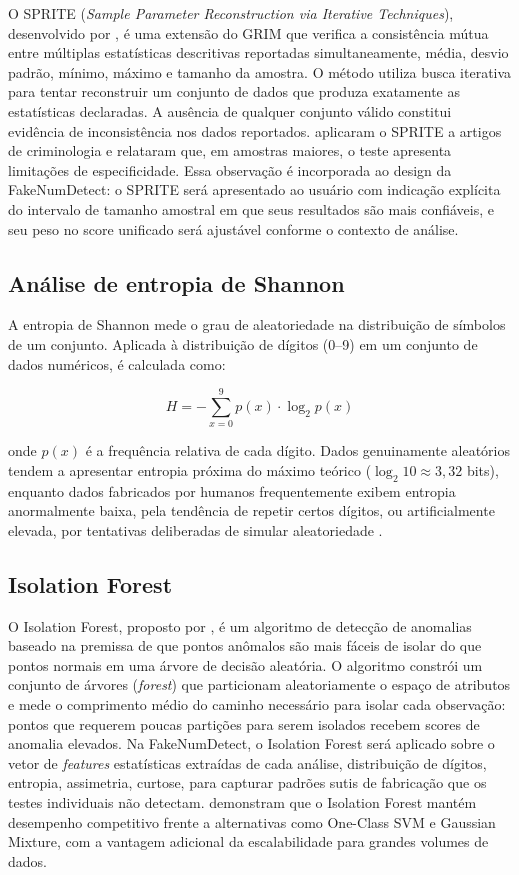 \documentclass[
    12pt,                %
    openright,           %
    oneside,             %
    a4paper,             %
    english,             %
    brazil               %
]{abntex2}
\begin{document}
O SPRITE (\textit{Sample Parameter Reconstruction via Iterative Techniques}), desenvolvido por , é uma extensão do GRIM que verifica a consistência mútua entre múltiplas estatísticas descritivas reportadas simultaneamente, média, desvio padrão, mínimo, máximo e tamanho da amostra. O método utiliza busca iterativa para tentar reconstruir um conjunto de dados que produza exatamente as estatísticas declaradas. A ausência de qualquer conjunto válido constitui evidência de inconsistência nos dados reportados.
 aplicaram o SPRITE a artigos de criminologia e relataram que, em amostras maiores, o teste apresenta limitações de especificidade. Essa observação é incorporada ao design da FakeNumDetect: o SPRITE será apresentado ao usuário com indicação explícita do intervalo de tamanho amostral em que seus resultados são mais confiáveis, e seu peso no score unificado será ajustável conforme o contexto de análise.

\subsection{Análise de entropia de Shannon}
A entropia de Shannon \cite{Shannon1948} mede o grau de aleatoriedade na distribuição de símbolos de um conjunto. Aplicada à distribuição de dígitos (0--9) em um conjunto de dados numéricos, é calculada como:

\begin{equation}
    H = -\sum_{x=0}^{9} p(x) \cdot \log_2 p(x)
\end{equation}

onde \(p(x)\) é a frequência relativa de cada dígito. Dados genuinamente aleatórios tendem a apresentar entropia próxima do máximo teórico (\(\log_2 10 \approx 3{,}32\) bits), enquanto dados fabricados por humanos frequentemente exibem entropia anormalmente baixa, pela tendência de repetir certos dígitos, ou artificialmente elevada, por tentativas deliberadas de simular aleatoriedade \cite{Mosimann1995}.

\subsection{Isolation Forest}

O Isolation Forest, proposto por , é um algoritmo de detecção de anomalias baseado na premissa de que pontos anômalos são mais fáceis de isolar do que pontos normais em uma árvore de decisão aleatória. O algoritmo constrói um conjunto de árvores (\textit{forest}) que particionam aleatoriamente o espaço de atributos e mede o comprimento médio do caminho necessário para isolar cada observação: pontos que requerem poucas partições para serem isolados recebem scores de anomalia elevados.
Na FakeNumDetect, o Isolation Forest será aplicado sobre o vetor de \textit{features} estatísticas extraídas de cada análise, distribuição de dígitos, entropia, assimetria, curtose, para capturar padrões sutis de fabricação que os testes individuais não detectam.  demonstram que o Isolation Forest mantém desempenho competitivo frente a alternativas como One-Class SVM e Gaussian Mixture, com a vantagem adicional da escalabilidade para grandes volumes de dados.
\end{document}
